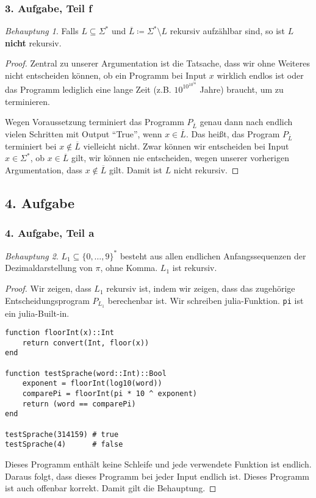 \documentclass[draft,a4paper]{article}
\theoremstyle{remark}
\newtheorem*{beh}{Behauptung}
\begin{document}
\subsubsection*{3. Aufgabe, Teil f}
\begin{beh}
  Falls \(L \subseteq \Sigma^{*}\) und
  \(\overline{L} \coloneq \Sigma^{*} \setminus L\) rekursiv aufzählbar sind, so ist
  \(L\) \textbf{nicht} rekursiv.
\end{beh}
\begin{proof}
  Zentral zu unserer Argumentation ist die Tatsache, dass wir ohne
  Weiteres nicht entscheiden können, ob ein Programm bei Input \(x\)
  wirklich endlos ist oder das Programm lediglich eine lange Zeit
  (z.B. \(10^{10^{10^{56}}}\) Jahre) braucht, um zu terminieren.

  Wegen Voraussetzung terminiert das Programm \(P_{\overline{L}}\)
  genau dann nach endlich vielen Schritten mit Output "`True"', wenn
  \(x \in \overline{L}\). Das heißt, das Program \(P_{\overline{L}}\)
  terminiert bei \(x \notin \overline{L}\) vielleicht nicht.  Zwar können
  wir entscheiden bei Input \(x \in \Sigma^{*}\), ob
  \(x \in \overline{L}\) gilt, wir können nie entscheiden, wegen unserer
  vorherigen Argumentation, dass \(x \notin \overline{L}\) gilt.  Damit ist
  \(L\) nicht rekursiv.
\end{proof}
\subsection*{4. Aufgabe}
\subsubsection*{4. Aufgabe, Teil a}
\begin{beh}
  \(L_{1} \subseteq \{0, \ldots, 9\}^{*}\) besteht aus allen endlichen
  Anfangssequenzen der Dezimaldarstellung von \(\pi\), ohne Komma.
  \(L_{1}\) ist rekursiv.
\end{beh}
\begin{proof}
  Wir zeigen, dass \(L_{1}\) rekursiv ist, indem wir zeigen, dass das
  zugehörige Entscheidungsprogram \(P_{L_{1}}\) berechenbar ist.  Wir
  schreiben \textsf{julia}-Funktion. \texttt{pi} ist ein \textsf{julia}-Built-in.
\begin{verbatim}
function floorInt(x)::Int
    return convert(Int, floor(x))
end

function testSprache(word::Int)::Bool
    exponent = floorInt(log10(word))
    comparePi = floorInt(pi * 10 ^ exponent)
    return (word == comparePi)
end

testSprache(314159) # true
testSprache(4)      # false
\end{verbatim}
  Dieses Programm enthält keine Schleife und jede verwendete Funktion
  ist endlich.  Daraus folgt, dass dieses Programm bei jeder Input
  endlich ist.  Dieses Programm ist auch offenbar korrekt.  Damit gilt
  die Behauptung.
\end{proof}
\end{document}

